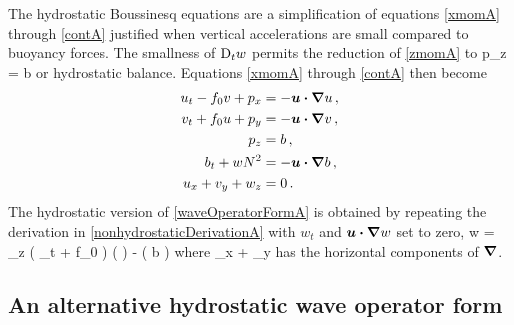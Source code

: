 \documentclass[12pt, oneside]{book}
\begin{document}
The hydrostatic Boussinesq equations are a simplification of equations \eqref{xmomA} through \eqref{contA} justified when vertical accelerations are small compared to buoyancy forces.  The smallness of $\mathrm{D}_t w$ permits the reduction of \eqref{zmomA} to
\beq
p_z = b \com
\eeq
or hydrostatic balance.  Equations \eqref{xmomA} through \eqref{contA} then become
\begin{align}
u_t - f_0 v + p_x &= - \boldsymbol u \boldsymbol \cdot \boldsymbol \nabla u \, , \label{xmomAH} \\
v_t + f_0 u + p_y &= - \boldsymbol u \boldsymbol \cdot \boldsymbol \nabla v \, , \label{ymomAH} \\
p_z &= b \, , \label{zmomAH} \\
b_t + w N^2 &= - \boldsymbol u \boldsymbol \cdot \boldsymbol \nabla b \, , \label{buoyAH} \\
u_x + v_y + w_z &= 0 \, . \label{contAH}
\end{align}
The hydrostatic version of \eqref{waveOperatorFormA} is obtained by repeating the derivation in \ch  \ref{nonhydrostaticDerivationA} with $w_t$ and $\boldsymbol u \boldsymbol \cdot \boldsymbol \nabla w$ set to zero,
\beq
{} w = \p_z \left ( \p_t \hnabla + f_0 \pnabla \right ) \bcdot \left ( \bu \bcdot \bnabla \right ) \bu - \hlap \left ( \bu \bcdot \bnabla b \right ) \com
\eeq
where 
\beq
\hnabla {} \p_x \bxh + \p_y \byh
\label{horizontalNabla}
\eeq
has the horizontal components of $\boldsymbol \nabla$. 

\subsection{An alternative hydrostatic wave operator form}
\end{document}
